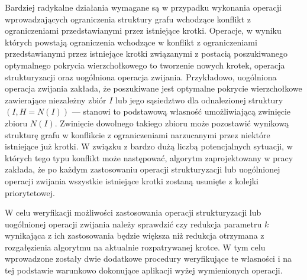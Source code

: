 \par{
  Bardziej radykalne działania wymagane są w przypadku wykonania operacji wprowadzających ograniczenia struktury grafu wchodzące konflikt z ograniczeniami przedstawianymi przez istniejące krotki.
  Operacje, w wyniku których powstają ograniczenia wchodzące w konflikt z ograniczeniami przedstawianymi przez istniejące krotki związanymi z postacią poszukiwanego optymalnego pokrycia wierzchołkowego to tworzenie nowych krotek, operacja strukturyzacji oraz uogólniona operacja zwijania.
  Przykładowo, uogólniona operacja zwijania zakłada, że poszukiwane jest optymalne pokrycie wierzchołkowe zawierające niezależny zbiór $I$ lub jego sąsiedztwo dla odnalezionej struktury $(I, H=N(I))$ --- stanowi to podstawową własność umożliwiającą zwinięcie zbioru $N(I)$.
  Zwinięcie dowolnego takiego zbioru może pozostawić wynikową strukturę grafu w konflikcie z ograniczeniami narzucanymi przez niektóre istniejące już krotki.
  W związku z bardzo dużą liczbą potencjalnych sytuacji, w których tego typu konflikt może następować, algorytm zaprojektowany w pracy~\cite{ImprovedBounds10} zakłada, że po każdym zastosowaniu operacji strukturyzacji lub uogólnionej operacji zwijania wszystkie istniejące krotki zostaną usunięte z kolejki priorytetowej.

  W celu weryfikacji możliwości zastosowania operacji strukturyzacji lub uogólnionej operacji zwijania należy sprawdzić czy redukcja parametru $k$ wynikająca z ich zastosowania będzie większa niż redukcja otrzymana z rozgałęzienia algorytmu na aktualnie rozpatrywanej krotce.
  W tym celu wprowadzone zostały dwie dodatkowe procedury weryfikujące te własności i na tej podstawie warunkowo dokonujące aplikacji wyżej wymienionych operacji.
}
